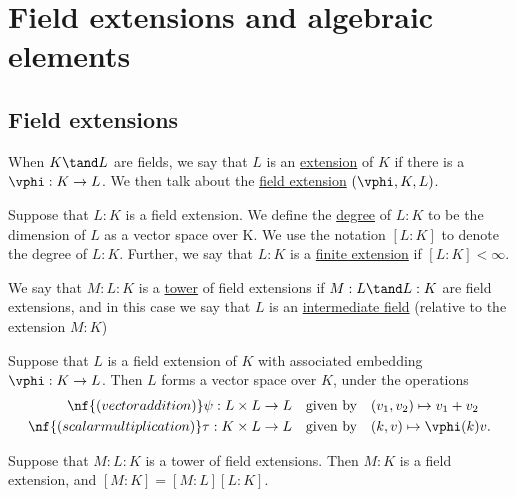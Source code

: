 \documentclass{article}
\begin{document}
\section{Field extensions and algebraic elements}
\subsection{Field extensions}
  \begin{tdefinition}
    When \( K \tand L \) are fields, we say that \( L \) is an \ul{extension} of \( K \) if there is a \homo~\( \vphi: K \to L \).
    We then talk about the \ul{field extension}
  \( (\vphi,K,L) \).
  \end{tdefinition}

  \begin{tdefinition}
    Suppose that \( L: K \) is a field extension.
    We define the \ul{degree} of \( L: K \) to be the dimension of \( L \) as a vector space over K.
    We use the notation \( [L : K] \) to denote the degree of \( L : K \).
    Further, we say that \( L : K \) is a \ul{finite extension} if \( [L: K] <\infty \).
  \end{tdefinition}

  \begin{tdefinition}
    We say that \( M : L : K \) is a \ul{tower} of field extensions if \( M : L \tand L: K \) are field extensions, and in this case we say that \( L \) is an \ul{intermediate field} (relative to the extension \( M : K \))
  \end{tdefinition}

  \begin{tproposition}
    Suppose that \( L \) is a field extension of \( K \) with associated embedding \( \vphi: K \to L \).
    Then \( L \) forms a vector space over \( K \), under the operations \begin{align*}
      \nf{(vector addition) } \psi: L\times L &\to L \quad \text{given by} \quad (v_1,v_2) \mapsto v_1 + v_2 \\
      \nf{(scalar multiplication) } \tau : K\times  L &\to L \quad \text{given by} \quad (k,v) \mapsto \vphi(k)v.
    \end{align*}
  \end{tproposition}

  \begin{ttheorem}
    Suppose that \( M :L: K \) is a tower of field extensions.
    Then \( M : K \) is a field extension, and \( [M : K] = [M : L][L: K] \).
  \end{ttheorem}
\end{document}
